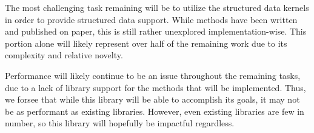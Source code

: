 \documentclass{sig-alternate}
\begin{document}
The most challenging task remaining will be to utilize the structured data kernels in order to
provide structured data support. While methods have been written and published on paper,
this is still rather unexplored implementation-wise. This portion alone will likely represent
over half of the remaining work due to its complexity and relative novelty. 

Performance will likely continue to be an issue throughout the remaining tasks, due to a lack
of library support for the methods that will be implemented. Thus, we forsee that while this 
library will be able to accomplish its goals, it may not be as performant as existing 
libraries. However, even existing libraries are few in number, so this library will hopefully
be impactful regardless. 

%
%
%
%
\end{document}

